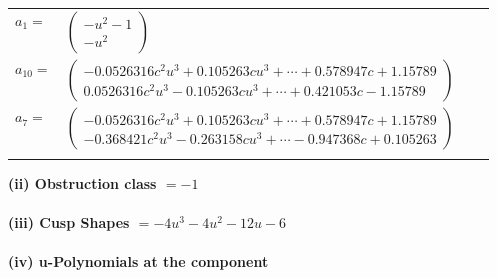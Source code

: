 \documentclass[1p]{elsarticle_modified}
\theoremstyle{definition}
\begin{document}
\begin{tabular}{m{7pt} m{180pt} m{7pt} m{180pt} }
\flushright $a_{1}=$&$\begin{pmatrix}- u^2-1\\- u^2\end{pmatrix}$ \\
\flushright $a_{10}=$&$\begin{pmatrix}-0.0526316 c^{2} u^{3}+0.105263 c u^{3}+\cdots+0.578947 c+1.15789\\0.0526316 c^{2} u^{3}-0.105263 c u^{3}+\cdots+0.421053 c-1.15789\end{pmatrix}$ \\
\flushright $a_{7}=$&$\begin{pmatrix}-0.0526316 c^{2} u^{3}+0.105263 c u^{3}+\cdots+0.578947 c+1.15789\\-0.368421 c^{2} u^{3}-0.263158 c u^{3}+\cdots-0.947368 c+0.105263\end{pmatrix}$\\&\end{tabular}
\flushleft \textbf{(ii) Obstruction class $= -1$}\\~\\
\flushleft \textbf{(iii) Cusp Shapes $= -4 u^3-4 u^2-12 u-6$}\\~\\
\newpage\renewcommand{\arraystretch}{1}
\flushleft \textbf{(iv) u-Polynomials at the component}\newline \\
\end{document}
